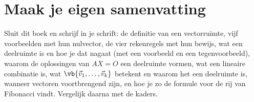 
\begin{oefeningen}






\end{oefeningen}


\ifzelfstudie
\section*{Maak je eigen samenvatting}
Sluit dit boek en schrijf in je schrift: de definitie van een vectorruimte, vijf voorbeelden met hun nulvector, de vier rekenregels met hun bewijs, wat een deelruimte is en hoe je dat nagaat (met een voorbeeld en een tegenvoorbeeld), waarom de oplossingen van $AX = O$ een deelruimte vormen, wat een lineaire combinatie is, wat $\vb{\vec v_1, \ldots, \vec v_k}$ betekent en waarom het een deelruimte is, wanneer vectoren voortbrengend zijn, en hoe je zo de formule voor de rij van Fibonacci vindt. Vergelijk daarna met de kaders.
\fi

